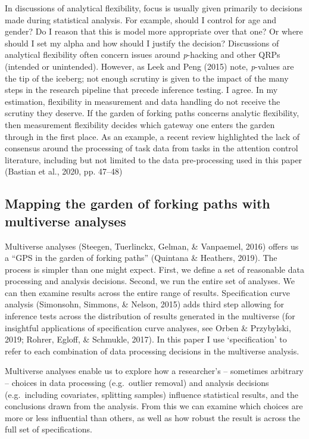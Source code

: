 \documentclass[
  man,floatsintext]{apa6}
\begin{document}
In discussions of analytical flexibility, focus is usually given primarily to decisions made during statistical analysis. For example, should I control for age and gender? Do I reason that this is model more appropriate over that one? Or where should I set my alpha and how should I justify the decision? Discussions of analytical flexibility often concern issues around \emph{p}-hacking and other QRPs (intended or unintended). However, as Leek and Peng (2015) note, \emph{p}-values are the tip of the iceberg; not enough scrutiny is given to the impact of the many steps in the research pipeline that precede inference testing. I agree. In my estimation, flexibility in measurement and data handling do not receive the scrutiny they deserve. If the garden of forking paths concerns analytic flexibility, then measurement flexibility decides which gateway one enters the garden through in the first place. As an example, a recent review highlighted the lack of consensus around the processing of task data from tasks in the attention control literature, including but not limited to the data pre-processing used in this paper (Bastian et al., 2020, pp. 47--48)

\hypertarget{mapping-the-garden-of-forking-paths-with-multiverse-analyses}{%
\subsection{Mapping the garden of forking paths with multiverse analyses}\label{mapping-the-garden-of-forking-paths-with-multiverse-analyses}}

Multiverse analyses (Steegen, Tuerlinckx, Gelman, \& Vanpaemel, 2016) offers us a ``GPS in the garden of forking paths'' (Quintana \& Heathers, 2019). The process is simpler than one might expect. First, we define a set of reasonable data processing and analysis decisions. Second, we run the entire set of analyses. We can then examine results across the entire range of results. Specification curve analysis (Simonsohn, Simmons, \& Nelson, 2015) adds third step allowing for inference tests across the distribution of results generated in the multiverse (for insightful applications of specification curve analyses, see Orben \& Przybylski, 2019; Rohrer, Egloff, \& Schmukle, 2017). In this paper I use `specification' to refer to each combination of data processing decisions in the multiverse analysis.

Multiverse analyses enable us to explore how a researcher's -- sometimes arbitrary -- choices in data processing (e.g.~outlier removal) and analysis decisions (e.g.~including covariates, splitting samples) influence statistical results, and the conclusions drawn from the analysis. From this we can examine which choices are more or less influential than others, as well as how robust the result is across the full set of specifications.
\end{document}
